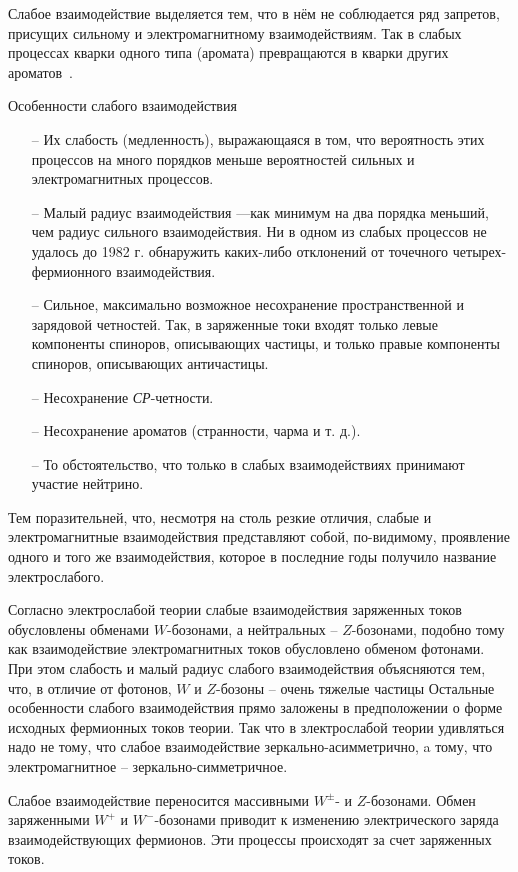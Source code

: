 Слабое взаимодействие выделяется тем, что в нём не соблюдается ряд запретов, присущих сильному и электромагнитному взаимодействиям. Так в слабых процессах кварки одного типа (аромата) превращаются в кварки других ароматов~\cite{nuclphys:weak}.

Особенности слабого взаимодействия

\begin{itemize}
	\item[--] Их слабость (медленность), выражающаяся в том, что
	вероятность этих процессов на много порядков меньше
	вероятностей сильных и электромагнитных процессов.
	
	\item[--] Малый радиус взаимодействия —как минимум на
	два порядка меньший, чем радиус сильного взаимодействия.
	Ни в одном из слабых процессов не удалось до 1982 г. обнаружить каких-либо отклонений от точечного четырех-
	фермионного взаимодействия.
	
	\item[--] Сильное, максимально возможное несохранение пространственной и зарядовой четностей. Так, в заряженные
	токи входят только левые компоненты спиноров, описывающих частицы, и только правые компоненты спиноров,
	описывающих античастицы.
	
	\item[--] Несохранение \textit{СР}-четности.
	
	\item[--] Несохранение ароматов (странности, чарма и т. д.).
	
	\item[--]  То обстоятельство, что только в слабых взаимодействиях принимают участие нейтрино.
	
\end{itemize}

Тем поразительней, что, несмотря на столь резкие отличия, слабые и электромагнитные взаимодействия представляют собой, по-видимому, проявление одного и того же
взаимодействия, которое в последние годы получило название электрослабого.

Согласно электрослабой теории слабые взаимодействия
заряженных токов обусловлены обменами $W$-бозонами, а
нейтральных -- $Z$-бозонами, подобно тому как взаимодействие электромагнитных токов обусловлено обменом фотонами. При этом слабость и малый радиус слабого взаимодействия объясняются тем, что, в отличие от фотонов, $W$ и $Z$-бозоны -- очень тяжелые частицы Остальные особенности слабого взаимодействия прямо заложены в предположении о форме исходных фермионных токов теории.
Так что в злектрослабой теории удивляться надо не тому,
что слабое взаимодействие зеркально-асимметрично, a тому, что электромагнитное -- зеркально-симметричное.

Слабое взаимодействие переносится массивными $W^±$- и $Z$-бозонами. Обмен заряженными $W^+$ и $W^-$-бозонами приводит к изменению электрического заряда взаимодействующих фермионов. Эти процессы происходят за счет заряженных токов.



